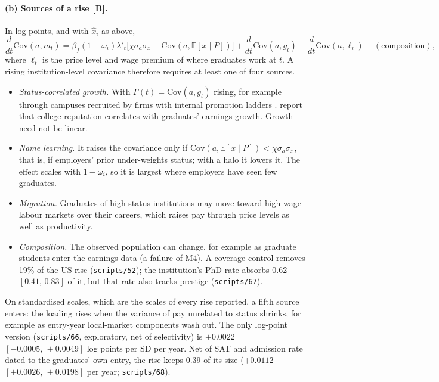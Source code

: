 \documentclass[11pt]{article}
\newcommand{\ci}[2]{$[#1,\allowbreak\,#2]$}
\begin{document}
\paragraph{(b) Sources of a rise [B].} In log points, and with $\hat x_i$ as above,
\[
\frac{d}{dt}\mathrm{Cov}(a,m_t)=\beta_f(1-\omega_i)\lambda'_t\big[\chi\sigma_a\sigma_x-\mathrm{Cov}(a,\mathbb E[x\mid P])\big]
+\frac{d}{dt}\mathrm{Cov}(a,g_t)+\frac{d}{dt}\mathrm{Cov}(a,\ell_t)+(\text{composition}),
\]
where $\ell_t$ is the price level and wage premium of where graduates work at $t$. A rising institution-level
covariance therefore requires at least one of four sources.
\begin{itemize}
\item \emph{Status-correlated growth.} With $\Gamma(t)=\mathrm{Cov}(a,g_t)$ rising, for example through campuses
recruited by firms with internal promotion ladders \citep{gibbons1999theory,rivera2015pedigree,weinstein2018employer}.
\citet{macleod2017big} report that college reputation correlates with graduates' earnings growth. Growth need not
be linear.
\item \emph{Name learning.} It raises the covariance only if $\mathrm{Cov}(a,\mathbb E[x\mid P])<\chi\sigma_a\sigma_x$,
that is, if employers' prior under-weights status; with a halo it lowers it. The effect scales with
$1-\omega_i$, so it is largest where employers have seen few graduates.
\item \emph{Migration.} Graduates of high-status institutions may move toward high-wage labour markets over their
careers, which raises pay through price levels as well as productivity.
\item \emph{Composition.} The observed population can change, for example as graduate students enter the
earnings data (a failure of M4). A coverage control removes 19\% of the US rise (\texttt{scripts/52}); the
institution's PhD rate absorbs 0.62 \ci{0.41}{0.83} of it, but that rate also tracks prestige (\texttt{scripts/67}).
\end{itemize}
On standardised scales, which are the scales of every rise reported, a fifth source enters: the loading rises when
the variance of pay unrelated to status shrinks, for example as entry-year local-market components wash out. The
only log-point version (\texttt{scripts/66}, exploratory, net of selectivity) is $+0.0022$ \ci{-0.0005}{+0.0049}
log points per SD per year. Net of SAT and admission rate dated to the graduates' own entry, the rise keeps 0.39 of
its size ($+0.0112$ \ci{+0.0026}{+0.0198} per year; \texttt{scripts/68}).
\end{document}
